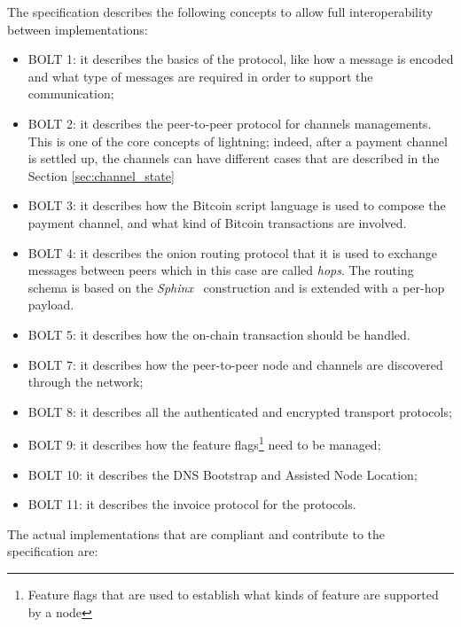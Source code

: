 The specification describes the following concepts to allow full interoperability between implementations:

\begin{itemize}
  \item BOLT 1: it describes the basics of the protocol, like how a message is encoded and what type of messages are required in order to support the communication;
  \item BOLT 2: it describes the peer-to-peer protocol for channels managements. This is one of the core concepts of lightning; indeed,  after a payment channel
        is settled up, the channels can have different cases that are described in the Section \ref{sec:channel_state}
  \item BOLT 3: it describes how the Bitcoin script language is used to compose the
        payment channel, and what kind of Bitcoin transactions are involved.
  \item BOLT 4: it describes the onion routing protocol that it is used to exchange messages between peers which in this case are called \emph{hops}.
        The routing schema is based on the \emph{Sphinx}~\cite{sphinx} construction and is extended with a per-hop payload.
  \item BOLT 5: it describes how the on-chain transaction should be handled.
  \item BOLT 7: it describes how the peer-to-peer node and channels are discovered through the network;
  \item BOLT 8: it describes all the authenticated and encrypted transport protocols;
  \item BOLT 9: it describes how the feature flags\footnote{Feature flags that are used to establish what kinds of feature are supported by a node} need to be managed;
  \item BOLT 10: it describes the DNS Bootstrap and Assisted Node Location;
  \item BOLT 11: it describes the invoice protocol for the {\LN} protocols.
\end{itemize}

The actual implementations that are compliant and contribute to the {\LN} specification are:

